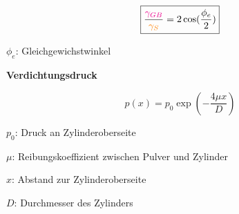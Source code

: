 \begin{minipage}{0.5\linewidth}
    \[
    \boxed{        
        \frac{\textcolor{magenta}{\gamma _{GB}}}{\textcolor{orange}{\gamma _S}} = 2 \cos(\frac{\phi_e}{2})
    }
    \]
\end{minipage}
\begin{minipage}{0.5\linewidth}
    \item $\phi_e$: Gleichgewichstwinkel
\end{minipage}
\vspace{1mm}

\textbf{Verdichtungsdruck}\\

\begin{minipage}{0.5\linewidth}
    \[
    \boxed{        
        p(x) = p_0 \exp \left( - \frac{4\mu x}{D} \right)
    }
    \]
\end{minipage}
\begin{minipage}{0.5\linewidth}
    \item $p_0$: Druck an Zylinderoberseite
    \item $\mu$: Reibungskoeffizient zwischen Pulver und Zylinder
    \item $x$: Abstand zur Zylinderoberseite
    \item $D$: Durchmesser des Zylinders
\end{minipage}
\vspace{1mm}